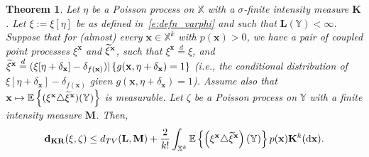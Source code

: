 \documentclass[10pt]{amsart}
\newtheorem{theo}{Theorem}[section]
\theoremstyle{definition}\newtheorem{defi}[theo]{Definition}\newtheorem{rema}[theo]{Remark}\newtheorem{exam}[theo]{Example}\newtheorem{exem}[theo]{Example}\newtheorem{nota}[theo]{Notation}
\newcommand*\bL{\mathbf{L}}
\newcommand*\bM{\mathbf{M}}
\newcommand*\bK{\mathbf{K}}
\newcommand{\bx}{\mathbf{x}}
\newcommand*\dkr{\mathbf{d_{KR}}}
\newcommand*\X{\mathbb{X}}
\newcommand*\Y{\mathbb{Y}}
\newcommand{\E}{\mathbb{E}}
\newcommand*\txi{\tilde{\xi}}
\newcommand*\md{\mathrm{d}}
\newcommand{\mean}[1] {\E\left\{{#1}\right\}}
\newcommand{\set}[1]{\left\{#1\right\}}
\let\oldtilde\tilde
\renewcommand*{\tilde}[1]{\mathchoice{\widetilde{#1}}{\widetilde{#1}}{\oldtilde{#1}}{\oldtilde{#1}}}
\begin{document}
\begin{theo}\label{t:KR_coupling}
Let $\eta$ be a Poisson process on $\X$ with a $\sigma$-finite intensity measure $\bK$. Let $\xi := \xi[\eta]$ be as defined in~\eqref{e:defn_varphi} and such that $\bL(\Y) < \infty$. Suppose that for (almost) every $\bx\in\X^k$ with $p(\bx) > 0$, we have a pair of coupled point processes $\xi^{\bx}$ and $\txi^{\bx}$, such that $\xi^{\bx}\stackrel{d}{=}\xi$, and $\txi^{\bx} \stackrel{d}{=} (\xi[\eta + \delta_{\bx}] - \delta_{f(\bx)}) | \set{ g(\bx,\eta + \delta_\bx) = 1}$ (i.e., the conditional distribution of $\xi[\eta + \delta_{\bx}] - \delta_{f(\bx)}$ given $g(\bx,\eta + \delta_\bx) = 1$). Assume also that $\bx \mapsto\mean{(\xi^{\bx} \triangle \txi^{\bx})(\Y)}$ is measurable. Let $\zeta$ be a Poisson process on $\Y$ with a finite intensity measure $\bM$. Then,
\[
\dkr(\xi,\zeta)  \leq d_{TV}(\bL,\bM) + \frac{2}{k!} \int_{\X^k} \mean{\left(\xi^{\bx} \triangle \txi^{\bx}\right)(\Y)} p(\bx)\bK^k(\md \bx).
\]
\end{theo}
\end{document}
